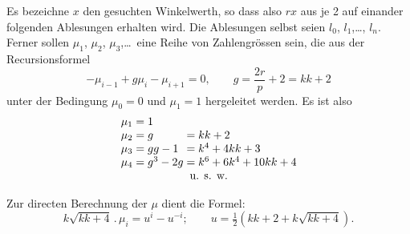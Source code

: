 \par\noindent\hspace*{\parindent}Es bezeichne $x$ den gesuchten Winkelwerth, so dass also $rx$ aus je 2 auf einander folgenden Ablesungen erhalten wird. Die Ablesungen selbst seien $l_0$, $l_1$,\ldots, $l_n$. Ferner sollen $\mu_1$, $\mu_2$, $\mu_3$,\ldots\ eine Reihe von Zahlengrössen sein, die aus der Recursionsformel
\[
-\mu_{i-1}+g\mu_i-\mu_{i+1}=0,\qquad g=\frac{2r}p+2=kk+2
\]
\noindent unter der Bedingung $\mu_0=0$ und $\mu_1=1$ hergeleitet werden. Es ist also
\[
\begin{array}{r@{\;}c@{\;}l@{\;}c@{\;}l}
\mu_1&=&1&&\\
\mu_2&=&g&=&kk+2\\
\mu_3&=&gg-1&=&k^4+4kk+3\\
\mu_4&=&g^3-2g&=&k^6+6k^4+10kk+4\\
\multicolumn{5}{c}{\text{u. s. w.}}
\end{array}
\]
\par\noindent\hspace*{\parindent}Zur directen Berechnung der $\mu$ dient die Formel:
\[
k\sqrt{kk+4}\,.\,\mu_i=u^i-u^{-i};\qquad u=\tfrac12(kk+2+k\sqrt{kk+4}).
\]
\par\endgroup

